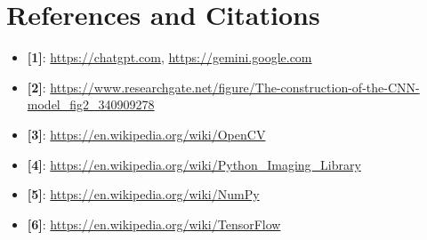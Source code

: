 \documentclass{article}
\begin{document}
\section{References and Citations}
\begin{itemize}
    \item \textbf{[1]}: \url{https://chatgpt.com}, \url{https://gemini.google.com}
    \item \textbf{[2]}: \url{https://www.researchgate.net/figure/The-construction-of-the-CNN-model_fig2_340909278}
    \item \textbf{[3]}: \url{https://en.wikipedia.org/wiki/OpenCV}
    \item \textbf{[4]}: \url{https://en.wikipedia.org/wiki/Python_Imaging_Library}
    \item \textbf{[5]}: \url{https://en.wikipedia.org/wiki/NumPy}
    \item \textbf{[6]}: \url{https://en.wikipedia.org/wiki/TensorFlow}
\end{itemize}
\end{document}
